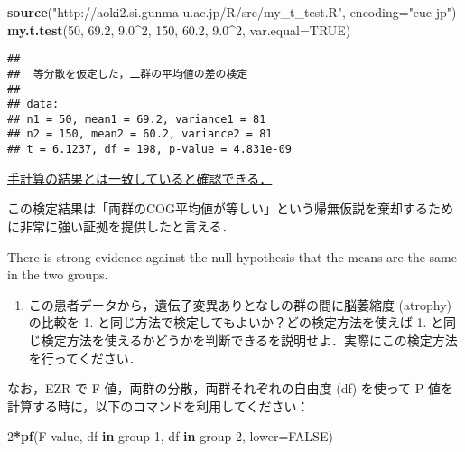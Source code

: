 \documentclass[11pt,]{problemset}
\newenvironment{Shaded}{\begin{snugshade}}{\end{snugshade}}
\newcommand{\ControlFlowTok}[1]{\textcolor[rgb]{0.13,0.29,0.53}{\textbf{#1}}}
\newcommand{\DataTypeTok}[1]{\textcolor[rgb]{0.13,0.29,0.53}{#1}}
\newcommand{\DecValTok}[1]{\textcolor[rgb]{0.00,0.00,0.81}{#1}}
\newcommand{\FloatTok}[1]{\textcolor[rgb]{0.00,0.00,0.81}{#1}}
\newcommand{\KeywordTok}[1]{\textcolor[rgb]{0.13,0.29,0.53}{\textbf{#1}}}
\newcommand{\NormalTok}[1]{#1}
\newcommand{\OperatorTok}[1]{\textcolor[rgb]{0.81,0.36,0.00}{\textbf{#1}}}
\newcommand{\OtherTok}[1]{\textcolor[rgb]{0.56,0.35,0.01}{#1}}
\newcommand{\StringTok}[1]{\textcolor[rgb]{0.31,0.60,0.02}{#1}}
\providecommand{\tightlist}{%
  \setlength{\itemsep}{0pt}\setlength{\parskip}{0pt}}
\begin{document}
\begin{Shaded}
\begin{Highlighting}[]
\KeywordTok{source}\NormalTok{(}\StringTok{"http://aoki2.si.gunma-u.ac.jp/R/src/my_t_test.R"}\NormalTok{, }\DataTypeTok{encoding=}\StringTok{"euc-jp"}\NormalTok{)}
\KeywordTok{my.t.test}\NormalTok{(}\DecValTok{50}\NormalTok{, }\FloatTok{69.2}\NormalTok{, }\FloatTok{9.0}\OperatorTok{^}\DecValTok{2}\NormalTok{, }\DecValTok{150}\NormalTok{, }\FloatTok{60.2}\NormalTok{, }\FloatTok{9.0}\OperatorTok{^}\DecValTok{2}\NormalTok{, }\DataTypeTok{var.equal=}\OtherTok{TRUE}\NormalTok{)}
\end{Highlighting}
\end{Shaded}

\begin{verbatim}
## 
##  等分散を仮定した，二群の平均値の差の検定
## 
## data:  
## n1 = 50, mean1 = 69.2, variance1 = 81
## n2 = 150, mean2 = 60.2, variance2 = 81
## t = 6.1237, df = 198, p-value = 4.831e-09
\end{verbatim}

\underline{手計算の結果とは一致していると確認できる．}

この検定結果は「両群のCOG平均値が等しい」という帰無仮説を棄却するために非常に強い証拠を提供したと言える．

There is strong evidence against the null hypothesis that the means are
the same in the two groups.

\newpage
\vfill

\begin{enumerate}
\def\labelenumi{\arabic{enumi}.}
\setcounter{enumi}{1}
\tightlist
\item
  この患者データから，遺伝子変異ありとなしの群の間に脳萎縮度 (atrophy)
  の比較を 1. と同じ方法で検定してもよいか？どの検定方法を使えば 1.
  と同じ検定方法を使えるかどうかを判断できるを説明せよ．実際にこの検定方法を行ってください．
\end{enumerate}

なお，EZR で F 値，両群の分散，両群それぞれの自由度 (df) を使って P
値を計算する時に，以下のコマンドを利用してください：

\begin{Shaded}
\begin{Highlighting}[]
\DecValTok{2}\OperatorTok{*}\KeywordTok{pf}\NormalTok{(F value, df }\ControlFlowTok{in}\NormalTok{ group }\DecValTok{1}\NormalTok{, df }\ControlFlowTok{in}\NormalTok{ group }\DecValTok{2}\NormalTok{, }\DataTypeTok{lower=}\OtherTok{FALSE}\NormalTok{)}
\end{Highlighting}
\end{Shaded}
\end{document}
